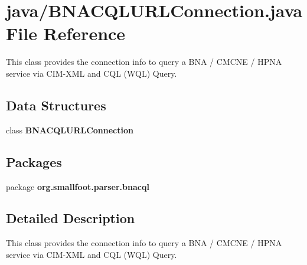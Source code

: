 \section{java/\+B\+N\+A\+C\+Q\+L\+U\+R\+L\+Connection.java File Reference}
\label{BNACQLURLConnection_8java}


This class provides the connection info to query a B\+N\+A / C\+M\+C\+N\+E / H\+P\+N\+A service via C\+I\+M-\/\+X\+M\+L and C\+Q\+L (W\+Q\+L) Query.  


\subsection*{Data Structures}
\begin{DoxyCompactItemize}
\item 
class {\bf B\+N\+A\+C\+Q\+L\+U\+R\+L\+Connection}
\end{DoxyCompactItemize}
\subsection*{Packages}
\begin{DoxyCompactItemize}
\item 
package {\bf org.\+smallfoot.\+parser.\+bnacql}
\end{DoxyCompactItemize}


\subsection{Detailed Description}
This class provides the connection info to query a B\+N\+A / C\+M\+C\+N\+E / H\+P\+N\+A service via C\+I\+M-\/\+X\+M\+L and C\+Q\+L (W\+Q\+L) Query. 

